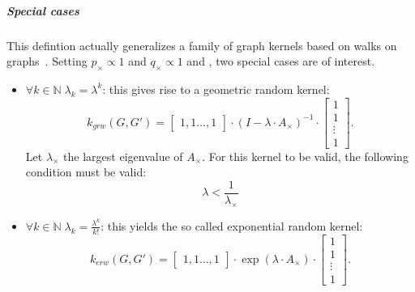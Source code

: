                 \subparagraph{Special cases}
                    This defintion actually generalizes a family of graph kernels based on walks on graphs~\parencite{vishwanathan2010graph}.
                    Setting $p_{\times} \propto 1$ and $q_{\times} \propto 1$ and , two special cases are of interest.
                    \begin{itemize}
                        \item $\forall k\in \mathbb{N} \; \lambda_k = \lambda^k$: this gives rise to a geometric random kernel:
                                \begin{equation}
                                    \label{eq::geometric_random_kernel}
                                    k_{grw}(G, G') = \begin{bmatrix}
                                        1, 1\dots,1
                                    \end{bmatrix}\cdot \left(I - \lambda\cdot A_{\times}\right)^{-1}\cdot\begin{bmatrix}
                                        1\\
                                        1\\
                                        \vdots\\
                                        1
                                    \end{bmatrix}.
                                \end{equation}
                                Let \(\lambda_{\times}\) the largest eigenvalue of \(A_{\times}\).
                                For this kernel to be valid, the following condition must be valid:
                                \begin{equation}
                                    \label{eq::condition_geometric_kernel_convergence}
                                    \lambda < \frac{1}{\lambda_{\times}}
                                \end{equation}
                        \item $\forall k\in \mathbb{N} \; \lambda_k = \frac{\lambda^k}{k!}$: this yields the so called exponential random kernel:
                                \begin{equation}
                                    \label{eq::geometric_random_kernel}
                                    k_{erw}(G, G') = \begin{bmatrix}
                                        1, 1\dots,1
                                    \end{bmatrix}\cdot \exp\left(\lambda\cdot A_{\times}\right)\cdot\begin{bmatrix}
                                        1\\
                                        1\\
                                        \vdots\\
                                        1
                                    \end{bmatrix}.
                                \end{equation}
                    \end{itemize}
